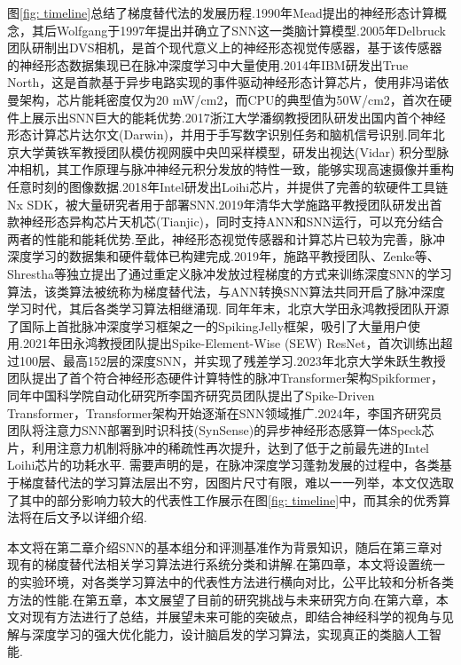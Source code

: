 \documentclass{SCIS2020cn}
\begin{document}
图\ref{fig: timeline}总结了梯度替代法的发展历程.1990年Mead提出的神经形态计算概念\cite{mead1990neuromorphic}，其后Wolfgang于1997年提出并确立了SNN这一类脑计算模型\cite{maass1997networks}.2005年Delbruck团队研制出DVS相机\cite{lichtsteiner2008128}，是首个现代意义上的神经形态视觉传感器，基于该传感器的神经形态数据集现已在脉冲深度学习中大量使用.2014年IBM研发出True North\cite{merolla2014million}，这是首款基于异步电路实现的事件驱动神经形态计算芯片，使用非冯诺依曼架构，芯片能耗密度仅为20 mW/cm2，而CPU的典型值为50W/cm2，首次在硬件上展示出SNN巨大的能耗优势.2017浙江大学潘纲教授团队研发出国内首个神经形态计算芯片达尔文(Darwin)\cite{ma2017darwin}，并用于手写数字识别任务和脑机信号识别.同年北京大学黄铁军教授团队模仿视网膜中央凹采样模型，研发出视达(Vidar)\cite{dong2017spike} 积分型脉冲相机，其工作原理与脉冲神经元积分发放的特性一致，能够实现高速摄像并重构任意时刻的图像数据.2018年Intel研发出Loihi芯片，并提供了完善的软硬件工具链Nx SDK，被大量研究者用于部署SNN.2019年清华大学施路平教授团队研发出首款神经形态异构芯片天机芯(Tianjic)\cite{pei2019towards}，同时支持ANN和SNN运行，可以充分结合两者的性能和能耗优势.至此，神经形态视觉传感器和计算芯片已较为完善，脉冲深度学习的数据集和硬件载体已构建完成.2019年，施路平教授团队\cite{wu2018STBP}、Zenke等\cite{10.1162/neco_a_01086}、Shrestha等\cite{shrestha2018slayer}独立提出了通过重定义脉冲发放过程梯度的方式来训练深度SNN的学习算法，该类算法被统称为梯度替代法，与ANN转换SNN算法共同开启了脉冲深度学习时代，其后各类学习算法相继涌现.
同年年末，北京大学田永鸿教授团队开源了国际上首批脉冲深度学习框架之一的SpikingJelly框架\cite{doi:10.1126/sciadv.adi1480}，吸引了大量用户使用.2021年田永鸿教授团队提出Spike-Element-Wise (SEW) ResNet\cite{SEWResNet}，首次训练出超过100层、最高152层的深度SNN，并实现了残差学习.2023年北京大学朱跃生教授团队提出了首个符合神经形态硬件计算特性的脉冲Transformer架构Spikformer\cite{zhou2023spikformer}，同年中国科学院自动化研究所李国齐研究员团队提出了Spike-Driven Transformer\cite{NEURIPS2023_ca0f5358}，Transformer架构开始逐渐在SNN领域推广.2024年，李国齐研究员团队将注意力SNN部署到时识科技(SynSense)的异步神经形态感算一体Speck芯片\cite{Yao2024}，利用注意力机制将脉冲的稀疏性再次提升，达到了低于之前最先进的Intel Loihi芯片的功耗水平.
需要声明的是，在脉冲深度学习蓬勃发展的过程中，各类基于梯度替代法的学习算法层出不穷，因图片尺寸有限，难以一一列举，本文仅选取了其中的部分影响力较大的代表性工作展示在图\ref{fig: timeline}中，而其余的优秀算法将在后文予以详细介绍.

本文将在第二章介绍SNN的基本组分和评测基准作为背景知识，随后在第三章对现有的梯度替代法相关学习算法进行系统分类和讲解.在第四章，本文将设置统一的实验环境，对各类学习算法中的代表性方法进行横向对比，公平比较和分析各类方法的性能.在第五章，本文展望了目前的研究挑战与未来研究方向.在第六章，本文对现有方法进行了总结，并展望未来可能的突破点，即结合神经科学的视角与见解与深度学习的强大优化能力，设计脑启发的学习算法，实现真正的类脑人工智能.
\end{document}
